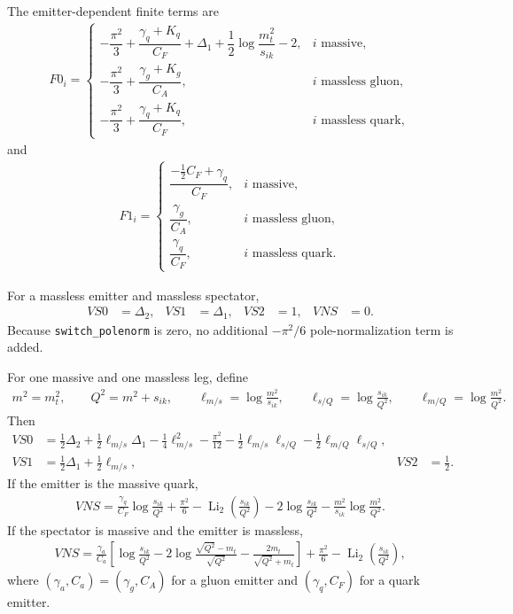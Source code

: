 \documentclass[11pt]{article}
\begin{document}
The emitter-dependent finite terms are
\begin{align}
F0_i=
\begin{cases}
-\dfrac{\pi^2}{3}+\dfrac{\gamma_q+K_q}{C_F}+\Delta_1+\dfrac12\log\dfrac{m_t^2}{s_{ik}}-2,
& i \text{ massive},\\[0.9em]
-\dfrac{\pi^2}{3}+\dfrac{\gamma_g+K_g}{C_A},
& i \text{ massless gluon},\\[0.9em]
-\dfrac{\pi^2}{3}+\dfrac{\gamma_q+K_q}{C_F},
& i \text{ massless quark},
\end{cases}
\end{align}
and
\begin{align}
F1_i=
\begin{cases}
\dfrac{-\frac12C_F+\gamma_q}{C_F}, & i \text{ massive},\\[0.7em]
\dfrac{\gamma_g}{C_A}, & i \text{ massless gluon},\\[0.7em]
\dfrac{\gamma_q}{C_F}, & i \text{ massless quark}.
\end{cases}
\end{align}

For a massless emitter and massless spectator,
\begin{align}
VS0&=\Delta_2,
&VS1&=\Delta_1,
&VS2&=1,
&VNS&=0.
\end{align}
Because \texttt{switch\_polenorm} is zero, no additional $-\pi^2/6$ pole-normalization term is added.

For one massive and one massless leg, define
\begin{align}
m^2=m_t^2,
\qquad
Q^2=m^2+s_{ik},
\qquad
\ell_{m/s}=\log\frac{m^2}{s_{ik}},
\qquad
\ell_{s/Q}=\log\frac{s_{ik}}{Q^2},
\qquad
\ell_{m/Q}=\log\frac{m^2}{Q^2}.
\end{align}
Then
\begin{align}
VS0 &= \frac12\Delta_2+\frac12\ell_{m/s}\Delta_1
-\frac14\ell_{m/s}^2-\frac{\pi^2}{12}
-\frac12\ell_{m/s}\ell_{s/Q}
-\frac12\ell_{m/Q}\ell_{s/Q},\\
VS1 &= \frac12\Delta_1+\frac12\ell_{m/s},
&VS2&=\frac12.
\end{align}
If the emitter is the massive quark,
\begin{align}
VNS = \frac{\gamma_q}{C_F}\log\frac{s_{ik}}{Q^2}
+\frac{\pi^2}{6}
-\operatorname{Li}_2\!\left(\frac{s_{ik}}{Q^2}\right)
-2\log\frac{s_{ik}}{Q^2}
-\frac{m^2}{s_{ik}}\log\frac{m^2}{Q^2}.
\end{align}
If the spectator is massive and the emitter is massless,
\begin{align}
VNS = \frac{\gamma_a}{C_a}
\left[
\log\frac{s_{ik}}{Q^2}
-2\log\frac{\sqrt{Q^2}-m_t}{\sqrt{Q^2}}
-\frac{2m_t}{\sqrt{Q^2}+m_t}
\right]
+\frac{\pi^2}{6}
-\operatorname{Li}_2\!\left(\frac{s_{ik}}{Q^2}\right),
\end{align}
where $(\gamma_a,C_a)=(\gamma_g,C_A)$ for a gluon emitter and $(\gamma_q,C_F)$ for a quark emitter.
\end{document}

